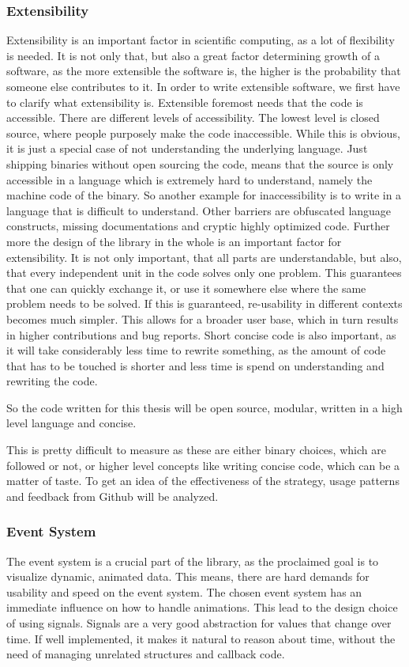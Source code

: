 \subsubsection{Extensibility}
Extensibility is an important factor in scientific computing, as a lot of flexibility is needed. 
It is not only that, but also a great factor determining growth of a software, as the more extensible the software is, the higher is the probability that someone else contributes to it.
In order to write extensible software, we first have to clarify what extensibility is.
Extensible foremost needs that the code is accessible. There are different levels of accessibility. The lowest level is closed source, where people purposely make the code inaccessible. While this is obvious, it is just a special case of not understanding the underlying language. Just shipping binaries without open sourcing the code, means that the source is only accessible in a language which is extremely hard to understand, namely the machine code of the binary. So another example for inaccessibility is to write in a language that is difficult to understand. Other barriers are obfuscated language constructs, missing documentations and cryptic highly optimized code.
Further more the design of the library in the whole is an important factor for extensibility. It is not only important, that all parts are understandable, but also, that every independent unit in the code solves only one problem. This guarantees that one can quickly exchange it, or use it somewhere else where the same problem needs to be solved.
If this is guaranteed, re-usability in different contexts becomes much simpler. This allows for a broader user base, which in turn results in higher contributions and bug reports.
Short concise code is also important, as it will take considerably less time to rewrite something, as the amount of code that has to be touched is shorter and less time is spend on understanding and rewriting the code.

So the code written for this thesis will be open source, modular, written in a high level language and concise.

This is pretty difficult to measure as these are either binary choices, which are followed or not, 
or higher level concepts like writing concise code, which can be a matter of taste.
To get an idea of the effectiveness of the strategy, usage patterns and feedback from Github will be analyzed.

\subsubsection{Event System}
The event system is a crucial part of the library, as the proclaimed goal is to visualize dynamic, animated data.
This means, there are hard demands for usability and speed on the event system.
The chosen event system has an immediate influence on how to handle animations. 
This lead to the design choice of using signals. Signals are a very good abstraction for values that change over time.
If well implemented, it makes it natural to reason about time, without the need of managing unrelated structures and callback code.

